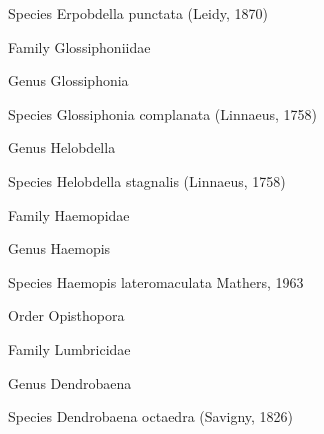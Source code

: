 \documentclass[9pt, article]{memoir}
\begin{document}
\begin{multicols}{2}
\vspace{6pt}\noindent\hspace{36pt}Species Erpobdella punctata (Leidy, 1870)


\vspace{6pt}\noindent\hspace{24pt}Family Glossiphoniidae


\vspace{6pt}\noindent\hspace{30pt}Genus Glossiphonia


\vspace{6pt}\noindent\hspace{36pt}Species Glossiphonia complanata (Linnaeus, 1758)


\vspace{6pt}\noindent\hspace{30pt}Genus Helobdella


\vspace{6pt}\noindent\hspace{36pt}Species Helobdella stagnalis (Linnaeus, 1758)


\vspace{6pt}\noindent\hspace{24pt}Family Haemopidae


\vspace{6pt}\noindent\hspace{30pt}Genus Haemopis


\vspace{6pt}\noindent\hspace{36pt}Species Haemopis lateromaculata Mathers, 1963


\vspace{6pt}\noindent\hspace{18pt}Order Opisthopora


\vspace{6pt}\noindent\hspace{24pt}Family Lumbricidae


\vspace{6pt}\noindent\hspace{30pt}Genus Dendrobaena


\vspace{6pt}\noindent\hspace{36pt}Species Dendrobaena octaedra (Savigny, 1826)



\end{multicols}
\end{document}
